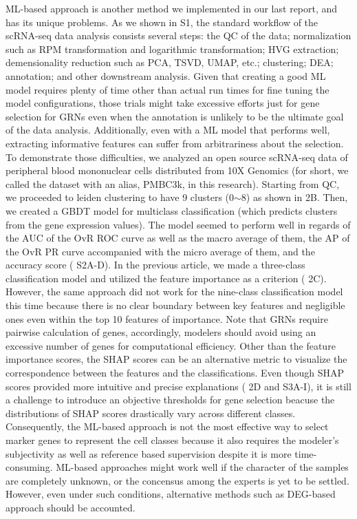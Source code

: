 \documentclass{article}
\begin{document}
ML-based approach is another method we implemented in our last report, and has its unique problems. As we 
shown in \figurename{ S1}, the standard workflow of the scRNA-seq data analysis consists several steps: the \ac{QC} 
of the data; normalization such as \ac{RPM} transformation and logarithmic transformation; 
\ac{HVG} extraction; demensionality reduction such as \ac{PCA}, 
\ac{TSVD}, \ac{UMAP}\cite{umap}, 
etc.; clustering; \ac{DEA}; annotation; and other downstream analysis\cite{luecken2019current}. Given that creating a good ML model 
requires plenty of time other than actual run times for fine tuning the model configurations, those trials might take 
excessive efforts just for gene selection for GRNs even when the annotation is unlikely to be the ultimate goal of 
the data analysis. Additionally, even with a ML model that performs well, extracting informative features can suffer 
from arbitrariness about the selection. To demonstrate those difficulties, we analyzed an open source scRNA-seq 
data of peripheral blood mononuclear cells distributed from 10X Genomics (for short, we called the dataset with 
an alias, PMBC3k, in this research). Starting from QC, we proceeded to leiden clustering to have 9 clusters (0$\sim$8) 
as shown in \figurename{ 2B}. Then, we created a GBDT model for multiclass classification (which predicts clusters from 
the gene expression values). The model seemed to perform well in regards of the \ac{AUC} of 
the \ac{OvR} \ac{ROC} curve as well as the macro average of 
them, the \ac{AP} of the \ac{OvR} \ac{PR} curve accompanied with the micro average of 
them, and the accuracy score (\figurename{ S2A-D}). In the previous article, we made a three-class classification model 
and utilized the feature importance as a criterion (\figurename{ 2C}). However, the same approach did not work for the 
nine-class classification model this time because there is no clear boundary between key features and negligible ones 
even within the top 10 features of importance. Note that GRNs require pairwise calculation of genes, accordingly, 
modelers should avoid using an excessive number of genes for computational efficiency. Other than the feature 
importance scores, the \ac{SHAP} scores can be an alternative metric to visualize the correspondence between the features 
and the classifications\cite{shap}. Even though SHAP scores provided more intuitive and precise explanations (\figurename{ 2D and S3A-I}), 
it is still a challenge to introduce an objective thresholds for gene selection beacuse the distributions 
of SHAP scores drastically vary across different classes. Consequently, the ML-based approach is not the most 
effective way to select marker genes to represent the cell classes because it also requires the modeler's subjectivity as well as reference based supervision 
despite it is more time-consuming. ML-based approaches might work well if the character of the samples are 
completely unknown, or the concensus among the experts is yet to be settled. However, even under such conditions, 
alternative methods such as DEG-based approach should be accounted.
\end{document}
